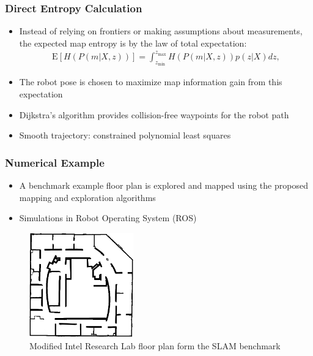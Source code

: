 \documentclass[11pt,professionalfonts,hyperref={pdftex,pdfpagemode=none,pdfstartview=FitH}]{beamer}
\renewcommand{\emph}[1]{\textit{\textbf{\color{blue}{#1}}}}
\begin{document}
\begin{frame}
\frametitle{Direct Entropy Calculation}
\begin{itemize}
        	\item Instead of relying on frontiers or making assumptions about measurements, the expected map entropy is \emph{calculated directly} by the law of total expectation:
	\begin{align*}
		\text{E}[H(P(m|X,z))]=\int_{z_\text{min}}^{z_\text{max}}
		H(P(m|X,z))p(z|X)dz,
	\end{align*}
	\item The robot pose is chosen to maximize map information gain from this expectation
	\item Dijkstra's algorithm provides collision-free waypoints for the robot path
	\item Smooth trajectory: constrained polynomial least squares 
\end{itemize}


\end{frame}


\begin{frame}
\frametitle{Numerical Example}
\begin{itemize}
        	\item A benchmark example floor plan is explored and mapped using the proposed mapping and exploration algorithms
	\item Simulations in Robot Operating System (ROS)
\end{itemize}
\begin{figure}
    \centering
    \includegraphics[width=0.4\textwidth]{intel_clean.png}
    \caption*{Modified Intel Research Lab floor plan form the SLAM benchmark}
\end{figure}

\end{frame}

\end{document}
